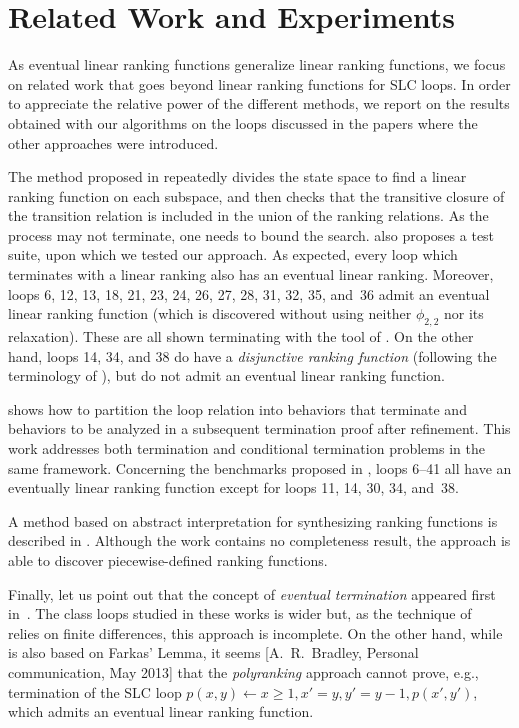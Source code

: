 \documentclass{acm_proc_article-sp}
\begin{document}
\section{Related Work and Experiments }
\label{sec:related-work-and-experiments}

As eventual linear ranking functions generalize linear ranking
functions, we focus on related work that goes beyond linear ranking
functions for SLC loops.
In order to appreciate the relative power of the different methods,
we report on the results obtained with  our algorithms on the loops
discussed in the papers where the other approaches were introduced.

The method proposed in \cite{ChenFM12} repeatedly divides the state
space to find a linear ranking function on each subspace, and then
checks that the transitive closure of the transition relation is
included in the union of the ranking relations.
As the process may not terminate, one needs to bound the search.
\cite{ChenFM12} also proposes a test suite, upon which we tested
our approach.
As expected, every loop \cite[Table~1]{ChenFM12} which terminates with
a linear ranking also has an eventual linear ranking.
Moreover, loops 6, 12, 13, 18, 21, 23, 24, 26, 27, 28, 31, 32, 35, and~36
admit an eventual linear ranking function (which is discovered without
using neither $\phi_{2,2}$ nor its relaxation).
These are all shown terminating with the tool of \cite{ChenFM12}.
On the other hand, loops 14, 34, and 38 do have a
\emph{disjunctive ranking function}
(following the terminology of \cite{ChenFM12}),
but do not admit an eventual linear ranking function.

\cite{GantyG13} shows how to partition the loop relation into
behaviors that terminate and behaviors to be analyzed in a subsequent
termination proof after refinement.
This work addresses both termination  and  conditional termination problems
in the same framework.
Concerning the benchmarks proposed in \cite[Table~1]{GantyG13},
loops 6--41 all have an eventually linear ranking function except for
loops 11, 14, 30, 34, and~38.

A method based on abstract interpretation for synthesizing
ranking functions is described in \cite{Urban13}.
Although the work contains no completeness result, the approach
is able to discover piecewise-defined ranking functions.

Finally, let us point out that the concept of \emph{eventual termination}
appeared first in~\cite{BradleyMS05ICALP,BradleyMS05VMCAI}.
The class loops studied in these works is wider but,
as the technique of~\cite{BradleyMS05VMCAI} relies on finite differences,
this approach is incomplete.
On the other hand, while \cite{BradleyMS05ICALP} is also based
on Farkas' Lemma, it seems
[A.~R.~Bradley, Personal communication, May 2013]
that the \emph{polyranking} approach cannot
prove, e.g., termination of the SLC loop
$p(x, y) \leftarrow x \ge 1, x' = y, y' = y-1, p(x', y')$, which admits
an eventual linear ranking function.
\end{document}
